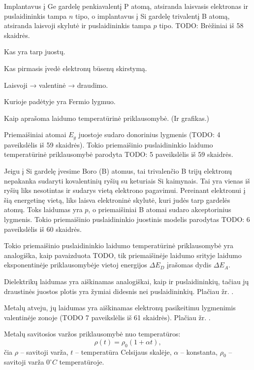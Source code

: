 Implantavus į Ge gardelę penkiavalentį P atomą, atsiranda laisvasis
elektronas ir puslaidininkis tampa $n$ tipo, o implantavus į
Si gardelę trivalentį B atomą, atsiranda laisvoji skylutė ir
puslaidininkis tampa $p$ tipo. TODO: Brėžiniai iš 58 skaidrės.

\begin{remember}
  \item Kas yra tarp juostų.
  \item Kas pirmasis įvedė elektronų būsenų skirstymą.
  \item Laisvoji → valentinė → draudimo.
  \item Kurioje padėtyje yra Fermio lygmuo.
  \item Kaip aprašoma laidumo temperatūrinė priklausomybė. (Ir grafikas.)
\end{remember}

Priemaišiniai atomai $E_{g}$ juostoje sudaro donorinius
lygmenis (TODO: 4 paveikslėlis iš 59 skaidrės). Tokio priemaišinio
puslaidininkio laidumo temperatūrinė priklausomybė
parodyta TODO: 5 paveikslėlis iš 59 skaidrės.

Jeigu į Si gardelę įvesime Boro (B) atomus, tai trivalenčio B
trijų elektronų nepakanka sudaryti kovalentinių ryšių su
keturiais Si kaimynais. Tai yra vienas iš ryšių liks nesotintas
ir sudarys vietą elektrono pagavimui. Pereinant elektronui į šią
energetinę vietą, liks laisva elektroninė skylutė, kuri judės
tarp gardelės atomų. Toks laidumas yra $p$, o priemaišiniai
B atomai sudaro akceptorinius lygmenis. Tokio priemaišinio puslaidininkio
juostinis modelis parodytas TODO: 6 paveikslėlis iš 60 skaidrės.

Tokio priemaišinio puslaidininkio laidumo temperatūrinė priklausomybė
yra analogiška, kaip pavaizduota TODO, tik priemaišinėje laidumo
srityje laidumo eksponentinėje priklausomybėje vietoj
energijos $\Delta E_{D}$ įrašomas dydis $\Delta E_{A}$.

Dielektrikų laidumas yra aiškinamas analogiškai, kaip ir
puslaidininkių, tačiau jų draustinės juostos plotis yra žymiai
didesnis nei puslaidininkių.
Plačiau žr. \cite[59p.]{elektra-magnetizmas}.

Metalų atveju, jų laidumas yra aiškinamas elektronų pasikeitimu lygmenimis
valentinėje zonoje (TODO 7 paveikslėlis iš 61 skaidrės).
Plačiau žr. \cite[55p.]{elektra-magnetizmas}.

Metalų savitosios varžos priklausomybė nuo temperatūros:
\begin{equation*}
  \rho(t) = \rho_{0} \left( 1 + \alpha t \right),
\end{equation*}
čia $\rho$ – savitoji varža, $t$ – temperatūra Celsijaus skalėje,
$\alpha$ – konstanta, $\rho_{0}$ – savitoji varža $0^{\circ}C$
temperatūroje.

